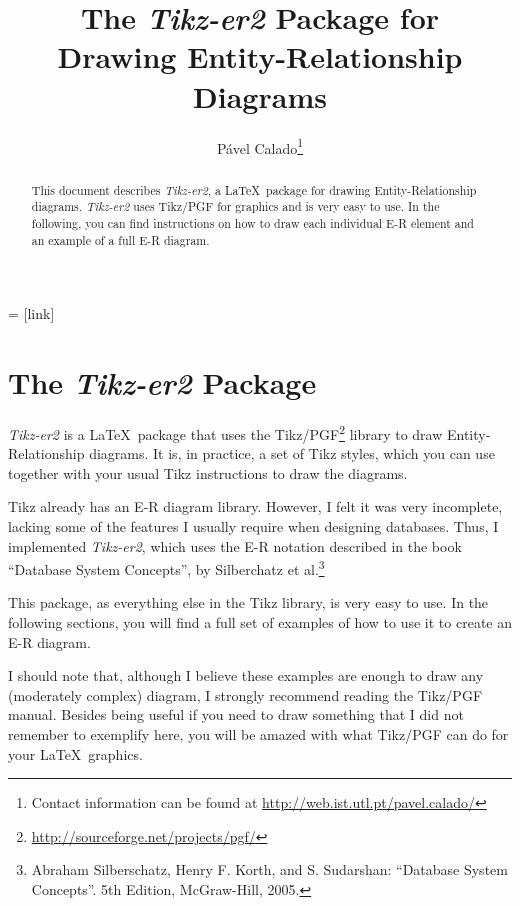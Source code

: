 \documentclass[12pt]{article}
\begin{document}
\title{The \emph{Tikz-er2} Package for\\Drawing Entity-Relationship Diagrams}
\author{P\'avel Calado\footnote{Contact information can be found at \protect\url{http://web.ist.utl.pt/pavel.calado/}}}
\maketitle

 = [link]

\tableofcontents

\begin{abstract}
    This document describes \emph{Tikz-er2}, a \LaTeX\ package for drawing
    Entity-Relationship diagrams. \emph{Tikz-er2} uses Tikz/PGF for graphics
    and is very easy to use. In the following, you can find instructions on how
    to draw each individual E-R element and an example of a full E-R diagram.
\end{abstract}

\section{The \emph{Tikz-er2} Package}
\label{sec:emphtikz-er2-package}

\emph{Tikz-er2} is a \LaTeX\ package that uses the
Tikz/PGF\footnote{\url{http://sourceforge.net/projects/pgf/}} library to draw
Entity-Relationship diagrams.  It is, in practice, a set of Tikz styles, which
you can use together with your usual Tikz instructions to draw the diagrams.

Tikz already has an E-R diagram library.  However, I felt it was very
incomplete, lacking some of the features I usually require when designing
databases. Thus, I implemented \emph{Tikz-er2}, which uses the E-R notation
described in the book ``Database System Concepts'', by Silberchatz et
al.\footnote{Abraham Silberschatz, Henry F. Korth, and S. Sudarshan: ``Database
System Concepts''. 5th Edition, McGraw-Hill, 2005.}

This package, as everything else in the Tikz library, is very easy to use. In
the following sections, you will find a full set of examples of how to use it to
create an E-R diagram.

I should note that, although I believe these examples are enough to draw any
(moderately complex) diagram, I strongly recommend reading the Tikz/PGF
manual. Besides being useful if you need to draw something that I did not
remember to exemplify here, you will be amazed with what Tikz/PGF can do for
your \LaTeX\ graphics.
\end{document}

